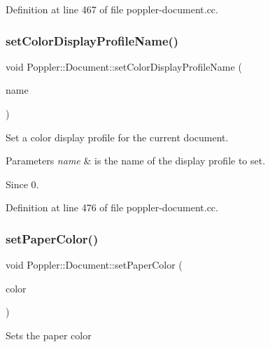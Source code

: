 Definition at line 467 of file poppler-\/document.\+cc.

\mbox{\label{class_poppler_1_1_document_aa72744f77b5b185fee257e32847f62c4}} 
\subsubsection{\texorpdfstring{set\+Color\+Display\+Profile\+Name()}{setColorDisplayProfileName()}}
{\footnotesize\ttfamily void Poppler\+::\+Document\+::set\+Color\+Display\+Profile\+Name (\begin{DoxyParamCaption}\item[{const Q\+String \&}]{name }\end{DoxyParamCaption})}

Set a color display profile for the current document.


\begin{DoxyParams}{Parameters}
{\em name} & is the name of the display profile to set.\\
\hline
\end{DoxyParams}
\begin{DoxySince}{Since}
0. 
\end{DoxySince}


Definition at line 476 of file poppler-\/document.\+cc.

\mbox{\label{class_poppler_1_1_document_a4901da93d4deac9a263a219c33642176}} 
\subsubsection{\texorpdfstring{set\+Paper\+Color()}{setPaperColor()}}
{\footnotesize\ttfamily void Poppler\+::\+Document\+::set\+Paper\+Color (\begin{DoxyParamCaption}\item[{const Q\+Color \&}]{color }\end{DoxyParamCaption})}

Sets the paper color


